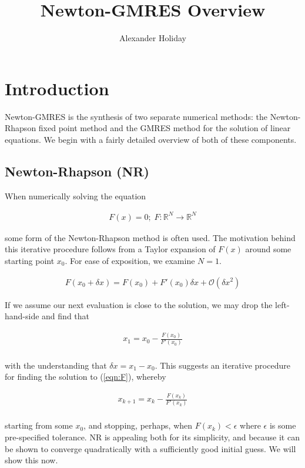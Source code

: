 \documentclass[11pt]{article}
\begin{document}
\title{\vspace{-10mm}Newton-GMRES Overview}
\author{Alexander Holiday}
\maketitle

\section{Introduction}
Newton-GMRES is the synthesis of two separate numerical methods: the Newton-Rhapson fixed point method and the GMRES method for the solution of linear equations. We begin with a fairly detailed overview of both of these components.

\subsection{Newton-Rhapson (NR)}

When numerically solving the equation

\begin{align}
\label{eqn:F}
F(x) = 0 ; \; F: \mathbb{R}^N \rightarrow \mathbb{R}^N
\end{align}

some form of the Newton-Rhapson method is often used. The motivation behind this iterative procedure follows from a Taylor expansion of $F(x)$ around some starting point $x_0$. For ease of exposition, we examine $N=1$.

\begin{align*}
F(x_0 + \delta x) = F(x_0) + F'(x_0) \delta x + \mathcal{O}(\delta x^2)
\end{align*}

If we assume our next evaluation is close to the solution, we may drop the left-hand-side and find that

\begin{align*}
x_1 = x_0 - \frac{F(x_0)}{F'(x_0)} \\
\end{align*}

with the understanding that $\delta x = x_1 - x_0$. This suggests an iterative procedure for finding the solution to (\ref{eqn:F}), whereby 

\begin{align*}
x_{k+1} = x_k - \frac{F(x_k)}{F'(x_k)} \\
\end{align*}

starting from some $x_0$, and stopping, perhaps, when $F(x_k) < \epsilon$ where $\epsilon$ is some pre-specified tolerance. NR is appealing both for its simplicity, and because it can be shown to converge quadratically with a sufficiently good initial guess. We will show this now.
\end{document}
